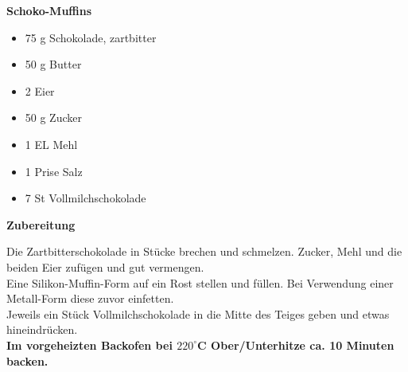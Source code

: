 
\parindent0pt	

\pagestyle{empty}


\textbf{{\LARGE Schoko-Muffins}}%


\hrulefill
\vspace*{\fill}
\begin{multicols}{2}	


\begin{itemize}
\item 75 g Schokolade, zartbitter
\item 50 g Butter
\item 2	Eier
\item 50 g Zucker
\item 1 EL Mehl
\item 1 Prise Salz
\item 7 St Vollmilchschokolade
\end{itemize}

\end{multicols}
\vfill
\newpage
\textbf{{\LARGE Zubereitung}}%

\hrulefill

\vspace*{\fill}
\begin{multicols}{2}

Die Zartbitterschokolade in Stücke brechen und schmelzen. 
Zucker, Mehl und die beiden Eier zufügen und gut vermengen.\\

Eine Silikon-Muffin-Form auf ein Rost stellen und füllen. 
Bei Verwendung einer Metall-Form diese zuvor einfetten.\\ 
Jeweils ein Stück Vollmilchschokolade in die Mitte des Teiges geben und etwas hineindrücken.\\
 
\textbf{Im vorgeheizten Backofen bei $220^\circ$C Ober/Unterhitze ca. 10 Minuten backen.}


\end{multicols}
\vfill

